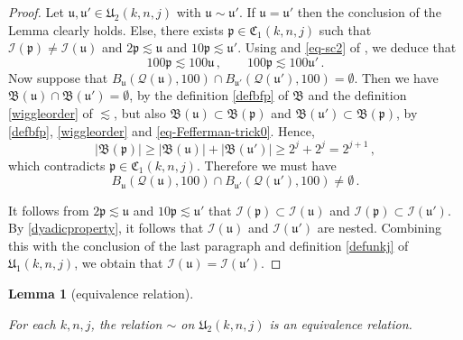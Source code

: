 \documentclass[10pt,a4paper]{article}
\theoremstyle{plain}
\newtheorem{lemma}[theorem]{Lemma}
\theoremstyle{definition}
\numberwithin{equation}{subsection}
\newcommand{\fp}{{\mathfrak p}}
\newcommand{\fu}{{\mathfrak u}}
\newcommand{\fU}{{\mathfrak U}}
\newcommand{\fC}{{\mathfrak C}}
\newcommand{\scI}{{\mathcal{I}}} %
\newcommand{\fcc}{{\mathcal{Q}}}
\newcommand{\lean}[1]{}
\newcommand{\uses}[1]{}
\newcommand{\leanok}{}
\begin{document}
\begin{proof}
    \leanok
    Let $\fu, \fu' \in \fU_2(k,n,j)$ with $\fu \sim \fu'$. If $\fu = \fu'$ then the conclusion of the Lemma clearly holds. Else, there exists $\fp \in \fC_1(k,n,j)$ such that $\scI(\fp) \ne \scI(\fu)$ and $2 \fp \lesssim \fu$ and $10 \fp \lesssim \fu'$.
    Using  and \eqref{eq-sc2} of , we deduce that
    \begin{equation}
        \label{eq-Fefferman-trick0}
        100 \fp\lesssim 100 \fu\,, \qquad 100 \fp \lesssim 100\fu'\,.
    \end{equation}
    Now suppose that $B_{\fu}(\fcc(\fu), 100) \cap B_{\fu'}(\fcc(\fu'), 100) = \emptyset$. Then we have $\mathfrak{B}(\fu) \cap \mathfrak{B}(\fu') = \emptyset$, by the definition \eqref{defbfp} of $\mathfrak{B}$ and the definition \eqref{wiggleorder} of $\lesssim$, but also $\mathfrak{B}(\fu) \subset \mathfrak{B}(\fp)$ and $\mathfrak{B}(\fu') \subset \mathfrak{B}(\fp)$, by \eqref{defbfp}, \eqref{wiggleorder} and \eqref{eq-Fefferman-trick0}.
    Hence,
    $$
        |\mathfrak{B}(\fp)| \geq |\mathfrak{B}(\fu)| + |\mathfrak{B}(\fu')| \geq 2^{j} + 2^j = 2^{j+1}\,,
    $$
    which contradicts $\fp \in \fC_1(k,n,j)$. Therefore we must have
    \begin{equation*}
        B_{\fu}(\fcc(\fu), 100) \cap B_{\fu'}(\fcc(\fu'), 100) \ne \emptyset\, .
    \end{equation*}

    It follows from $2\fp \lesssim \fu$ and $10\fp \lesssim \fu'$ that $\scI(\fp) \subset \scI(\fu)$ and $\scI(\fp) \subset \scI(\fu')$. By \eqref{dyadicproperty}, it follows that $\scI(\fu)$ and $\scI(\fu')$ are nested.
    Combining this with the conclusion of the last paragraph and definition \eqref{defunkj} of $\fU_1(k,n,j)$, we obtain that $\scI(\fu) = \scI(\fu')$.
\end{proof}


\begin{lemma}[equivalence relation]
\label{equivalence-relation}
\uses{relation-geometry}
\leanok
\lean{equivalenceOn_urel}
For each $k,n,j$, the relation $\sim$ on
$\fU_2(k,n,j)$ is an equivalence relation.
\end{lemma}
\end{document}

